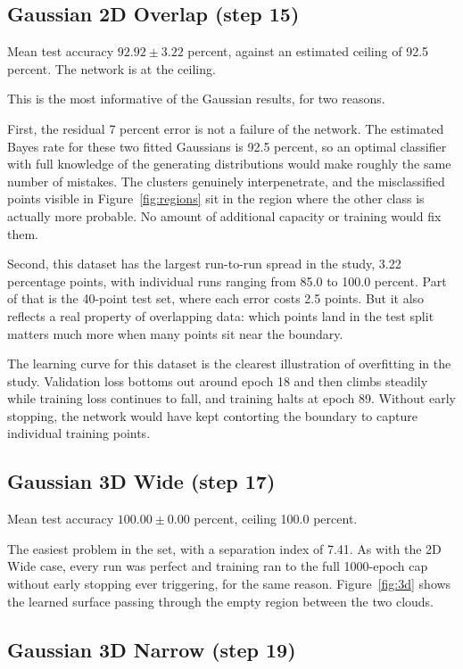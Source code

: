 \documentclass[11pt]{article}
\begin{document}
\subsection{Gaussian 2D Overlap (step 15)}

Mean test accuracy $92.92 \pm 3.22$ percent, against an estimated ceiling of
92.5 percent. The network is at the ceiling.

This is the most informative of the Gaussian results, for two reasons.

First, the residual 7 percent error is not a failure of the network. The
estimated Bayes rate for these two fitted Gaussians is 92.5 percent, so an
optimal classifier with full knowledge of the generating distributions would
make roughly the same number of mistakes. The clusters genuinely interpenetrate,
and the misclassified points visible in Figure~\ref{fig:regions} sit in the
region where the other class is actually more probable. No amount of additional
capacity or training would fix them.

Second, this dataset has the largest run-to-run spread in the study, 3.22
percentage points, with individual runs ranging from 85.0 to 100.0 percent. Part
of that is the 40-point test set, where each error costs 2.5 points. But it also
reflects a real property of overlapping data: which points land in the test
split matters much more when many points sit near the boundary.

The learning curve for this dataset is the clearest illustration of overfitting
in the study. Validation loss bottoms out around epoch 18 and then climbs
steadily while training loss continues to fall, and training halts at epoch 89.
Without early stopping, the network would have kept contorting the boundary to
capture individual training points.

\subsection{Gaussian 3D Wide (step 17)}

Mean test accuracy $100.00 \pm 0.00$ percent, ceiling 100.0 percent.

The easiest problem in the set, with a separation index of 7.41. As with the 2D
Wide case, every run was perfect and training ran to the full 1000-epoch cap
without early stopping ever triggering, for the same reason. Figure~\ref{fig:3d}
shows the learned surface passing through the empty region between the two
clouds.

\subsection{Gaussian 3D Narrow (step 19)}
\end{document}

